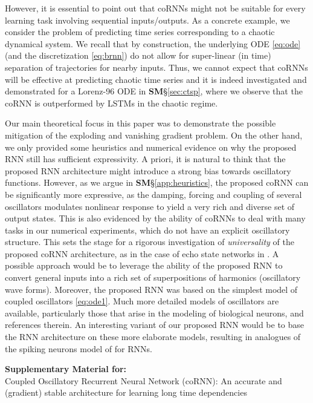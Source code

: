 \documentclass{article} \usepackage{iclr2021_conference,times}
\begin{document}
However, it is essential to point out that coRNNs might not be suitable for every learning task involving sequential inputs/outputs. As a concrete example, we consider the problem of predicting time series corresponding to a chaotic dynamical system. We recall that by construction, the underlying ODE \eqref{eq:ode} (and the discretization \eqref{eq:brnn}) do not allow for super-linear (in time) separation of trajectories for nearby inputs. Thus, we cannot expect that coRNNs will be effective at predicting chaotic time series and it is indeed investigated and demonstrated for a Lorenz-96 ODE in {\bf SM}\S\ref{sec:ctsp}, where we observe that the coRNN is outperformed by LSTMs in the chaotic regime.

Our main theoretical focus in this paper was to demonstrate the possible mitigation of the exploding and vanishing gradient problem. On the other hand, we only provided some heuristics and numerical evidence on why the proposed RNN still has sufficient expressivity. A priori, it is natural to think that the proposed RNN architecture might introduce a strong bias towards oscillatory functions. However, as we argue in {\bf SM}\S\ref{app:heuristics}, the proposed coRNN can be significantly more expressive, as the damping, forcing and coupling of several oscillators modulates nonlinear response to yield a very rich and diverse set of output states. This is also evidenced by the ability of coRNNs to deal with many tasks in our numerical experiments, which do not have an explicit oscillatory structure. This sets the stage for a rigorous investigation of \emph{universality} of the proposed coRNN architecture, as in the case of echo state networks in \cite{ort1}. A possible approach would be to leverage the ability of the proposed RNN to convert general inputs into a rich set of superpositions of harmonics (oscillatory wave forms). Moreover, the proposed RNN was based on the simplest model of coupled oscillators \eqref{eq:ode1}. Much more detailed models of oscillators are available, particularly those that arise in the modeling of biological neurons, \cite{ermen1} and references therein. An interesting variant of our proposed RNN would be to base the RNN architecture on these more elaborate models, resulting in analogues of the spiking neurons model of \cite{maass1} for RNNs.




\appendix
\newpage
\begin{center}
{\bf Supplementary Material for:}\\
Coupled Oscillatory Recurrent Neural Network (coRNN): An accurate and (gradient) stable architecture for learning long time dependencies
\end{center}
\end{document}
